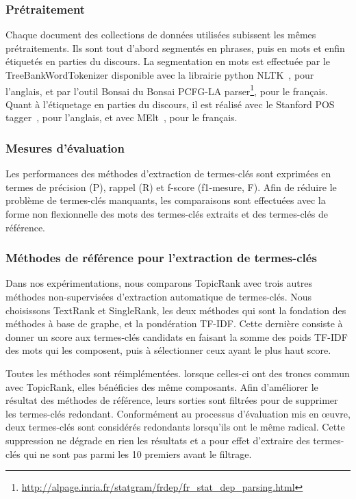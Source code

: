     \subsubsection{Prétraitement}
    \label{subsubsec:pretraitement}
      Chaque document des collections de données utilisées subissent les mêmes
      prétraitements. Ils sont tout d'abord segmentés en phrases, puis en mots
      et enfin étiquetés en parties du discours. La segmentation en mots est
      effectuée par le TreeBankWordTokenizer disponible avec la librairie python
      NLTK~\cite[\textit{Natural Language ToolKit}]{bird2009nltk}, pour
      l'anglais, et par l'outil Bonsai du Bonsai PCFG-LA
      parser\footnote{\url{http://alpage.inria.fr/statgram/frdep/fr_stat_dep_parsing.html}},
      pour le français. Quant à l'étiquetage en parties du discours, il est
      réalisé avec le Stanford POS tagger~\cite{toutanova2003stanfordpostagger},
      pour l'anglais, et avec MElt~\cite{denis2009melt}, pour le français.

    \subsubsection{Mesures d'évaluation}
    \label{subsubsec:mesures_d_evaluation}
      Les performances des méthodes d'extraction de termes-clés sont exprimées
      en termes de précision (P), rappel (R) et f-score (f1-mesure, F). Afin de
      réduire le problème de termes-clés manquants, les comparaisons sont
      effectuées avec la forme non flexionnelle des mots des termes-clés
      extraits et des termes-clés de référence.

    \subsubsection{Méthodes de référence pour l'extraction de termes-clés}
    \label{subsubsec:systemes_de_reference_pour_l_extraction_de_termes_cles}
      Dans nos expérimentations, nous comparons TopicRank avec trois autres
      méthodes non-supervisées d'extraction automatique de termes-clés. Nous
      choisissons TextRank et SingleRank, les deux méthodes qui sont la
      fondation des méthodes à base de graphe, et la pondération TF-IDF. Cette
      dernière consiste à donner un score aux termes-clés candidats en faisant
      la somme des poids TF-IDF des mots qui les composent, puis à sélectionner
      ceux ayant le plus haut score.

      Toutes les méthodes sont réimplémentées. lorsque celles-ci ont des troncs
      commun avec TopicRank, elles bénéficies des même composants. Afin
      d'améliorer le résultat des méthodes de référence, leurs sorties sont
      filtrées pour de supprimer les termes-clés redondant. Conformément au
      processus d'évaluation mis en \oe{}uvre, deux termes-clés sont considérés
      redondants lorsqu'ils ont le même radical. Cette suppression ne dégrade en
      rien les résultats et a pour effet d'extraire des termes-clés qui ne sont
      pas parmi les 10 premiers avant le filtrage.

